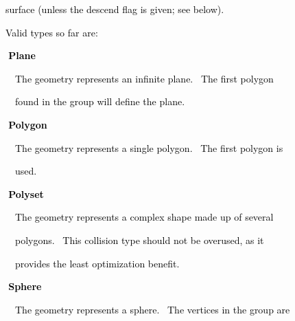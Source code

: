 \documentclass[a4paper]{article}
\newcommand\textstyleOOoComputerKeyWord[1]{\textrm{\textcolor[rgb]{0.0,0.0,0.5019608}{#1}}}
\begin{document}
{\color{black}
\textstyleOOoComputerKeyWord{\textcolor{black}{\ \ \ \ surface (unless the {\textquotedbl}descend{\textquotedbl} flag is
given; see below).}}}


\bigskip

{\color{black}
\textstyleOOoComputerKeyWord{\textcolor{black}{\ \ \ \ Valid types so far are:}}}


\bigskip

{\bfseries
\hypertarget{RefHeading7694869075401}{}\textstyleOOoComputerKeyWord{\textcolor{black}{\ \ \ \ Plane}}}


\bigskip

{\color{black}
\textstyleOOoComputerKeyWord{\textcolor{black}{\ \ \ \ \ \ The geometry represents an infinite plane. \ The first
polygon}}}

{\color{black}
\textstyleOOoComputerKeyWord{\textcolor{black}{\ \ \ \ \ \ found in the group will define the plane.}}}


\bigskip

{\bfseries
\hypertarget{RefHeading7696869075401}{}\textstyleOOoComputerKeyWord{\textcolor{black}{\ \ \ \ Polygon}}}


\bigskip

{\color{black}
\textstyleOOoComputerKeyWord{\textcolor{black}{\ \ \ \ \ \ The geometry represents a single polygon. \ The first polygon
is}}}

{\color{black}
\textstyleOOoComputerKeyWord{\textcolor{black}{\ \ \ \ \ \ used.}}}


\bigskip

{\bfseries
\hypertarget{RefHeading7698869075401}{}\textstyleOOoComputerKeyWord{\textcolor{black}{\ \ \ \ Polyset}}}


\bigskip

{\color{black}
\textstyleOOoComputerKeyWord{\textcolor{black}{\ \ \ \ \ \ The geometry represents a complex shape made up of several}}}

{\color{black}
\textstyleOOoComputerKeyWord{\textcolor{black}{\ \ \ \ \ \ polygons. \ This collision type should not be overused, as
it}}}

{\color{black}
\textstyleOOoComputerKeyWord{\textcolor{black}{\ \ \ \ \ \ provides the least optimization benefit.}}}


\bigskip

{\bfseries
\hypertarget{RefHeading7700869075401}{}\textstyleOOoComputerKeyWord{\textcolor{black}{\ \ \ \ Sphere}}}


\bigskip

{\color{black}
\textstyleOOoComputerKeyWord{\textcolor{black}{\ \ \ \ \ \ The geometry represents a sphere. \ The vertices in the group
are}}}
\end{document}
